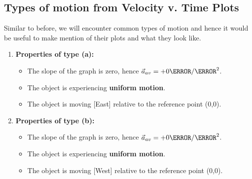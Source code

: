 \documentclass[12pt]{article}
\theoremstyle{break}
\begin{document}
\subsection{Types of motion from Velocity v. Time Plots}
Similar to before, we will encounter common types of motion and hence it would be useful to make mention of their plots and what they look like.
\begin{enumerate}[label = (\alph*)]
	\item 

		\textbf{\large{Properties of type (a):}}
		\begin{itemize}
			\item The slope of the graph is zero, hence $\vec a_{av} = +0\m / \s^2$.
			\item The object is experiencing \textbf{uniform motion}.
			\item The object is moving [East] relative to the reference point (0,0).
		\end{itemize}


	\item 
		
		\textbf{\large{Properties of type (b):}}
		\begin{itemize}
			\item The slope of the graph is zero, hence $\vec a_{av} = +0\m / \s^2$.
			\item The object is experiencing \textbf{uniform motion}.
			\item The object is moving [West] relative to the reference point (0,0).
		\end{itemize}



\end{enumerate}
\end{document}
